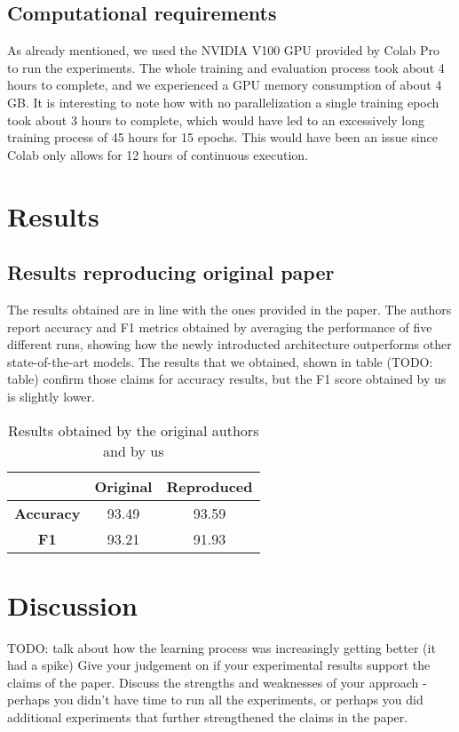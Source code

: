 \subsection{Computational requirements}
As already mentioned, we used the NVIDIA V100 GPU provided by Colab Pro to run the experiments. The whole training and evaluation process took about 4 hours to complete, and we experienced a GPU memory consumption of about 4 GB. It is interesting to note how with no parallelization a single training epoch took about 3 hours to complete, which would have led to an excessively long training process of 45 hours for 15 epochs. This would have been an issue since Colab only allows for 12 hours of continuous execution.

\section{Results}
\label{sec:results}

\subsection{Results reproducing original paper}
The results obtained are in line with the ones provided in the paper. The authors report accuracy and F1 metrics obtained by averaging the performance of five different runs, showing how the newly introducted architecture outperforms other state-of-the-art models. The results that we obtained, shown in table (TODO: table) confirm those claims for accuracy results, but the F1 score obtained by us is slightly lower. 

\begin{table}
    \caption{Results obtained by the original authors and by us}
    \label{tab:results}
    \centering
    \begin{tabular}{| c|c c|}
        \hline
         & \textbf{Original} & \textbf{Reproduced} \\
        \hline
         \textbf{Accuracy} & 93.49 & 93.59 \\
        \hline
        \textbf{F1} & 93.21 & 91.93 \\
        \hline
    \end{tabular}
\end{table}

\section{Discussion}

TODO: talk about how the learning process was increasingly getting better (it had a spike)
Give your judgement on if your experimental results support the claims of the paper. Discuss the strengths and weaknesses of your approach - perhaps you didn't have time to run all the experiments, or perhaps you did additional experiments that further strengthened the claims in the paper.

